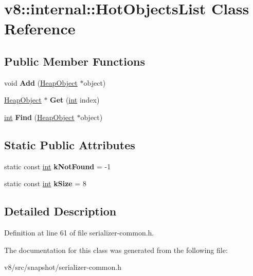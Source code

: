 \hypertarget{classv8_1_1internal_1_1HotObjectsList}{}\section{v8\+:\+:internal\+:\+:Hot\+Objects\+List Class Reference}
\label{classv8_1_1internal_1_1HotObjectsList}
\subsection*{Public Member Functions}
\begin{DoxyCompactItemize}
\item 
\mbox{\label{classv8_1_1internal_1_1HotObjectsList_ae2e8f66dc659ed64711f40b877562c97}} 
void {\bfseries Add} (\mbox{\hyperlink{classv8_1_1internal_1_1HeapObject}{Heap\+Object}} $\ast$object)
\item 
\mbox{\label{classv8_1_1internal_1_1HotObjectsList_aed0128ddec1cbdfd2d07c21426f2abea}} 
\mbox{\hyperlink{classv8_1_1internal_1_1HeapObject}{Heap\+Object}} $\ast$ {\bfseries Get} (\mbox{\hyperlink{classint}{int}} index)
\item 
\mbox{\label{classv8_1_1internal_1_1HotObjectsList_ac8b67deab7ff6f601d7c8350455696a1}} 
\mbox{\hyperlink{classint}{int}} {\bfseries Find} (\mbox{\hyperlink{classv8_1_1internal_1_1HeapObject}{Heap\+Object}} $\ast$object)
\end{DoxyCompactItemize}
\subsection*{Static Public Attributes}
\begin{DoxyCompactItemize}
\item 
\mbox{\label{classv8_1_1internal_1_1HotObjectsList_a2d7691ba467e300e60a5b53d7bc93827}} 
static const \mbox{\hyperlink{classint}{int}} {\bfseries k\+Not\+Found} = -\/1
\item 
\mbox{\label{classv8_1_1internal_1_1HotObjectsList_ac0fe4a67bfcd04ddaa0e406590c2c942}} 
static const \mbox{\hyperlink{classint}{int}} {\bfseries k\+Size} = 8
\end{DoxyCompactItemize}


\subsection{Detailed Description}


Definition at line 61 of file serializer-\/common.\+h.



The documentation for this class was generated from the following file\+:\begin{DoxyCompactItemize}
\item 
v8/src/snapshot/serializer-\/common.\+h\end{DoxyCompactItemize}

